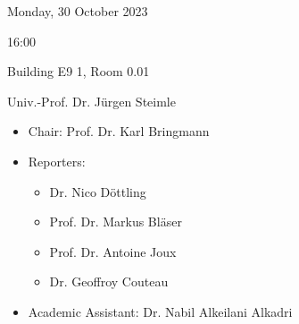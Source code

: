 
 Monday, 30 October 2023

 16:00

 Building E9 1, Room 0.01

 Univ.-Prof. Dr. J\"urgen Steimle

\begin{itemize}
    \item Chair:  Prof. Dr. Karl Bringmann
    \item Reporters: \begin{itemize}
        \item Dr. Nico D\"ottling
        \item Prof. Dr. Markus Bl\"aser
        \item Prof. Dr. Antoine Joux
        \item Dr. Geoffroy Couteau
    \end{itemize}
    \item Academic Assistant: Dr. Nabil Alkeilani Alkadri
\end{itemize}

